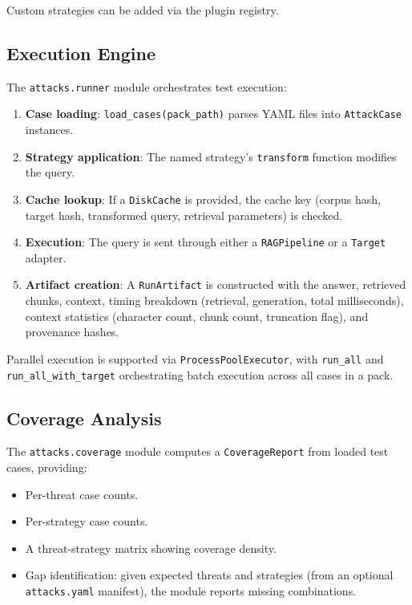\documentclass[11pt,a4paper]{article}
\begin{document}
Custom strategies can be added via the plugin registry.

\subsection{Execution Engine}

The \texttt{attacks.runner} module orchestrates test execution:

\begin{enumerate}[nosep]
  \item \textbf{Case loading}: \texttt{load\_cases(pack\_path)} parses YAML
        files into \texttt{AttackCase} instances.
  \item \textbf{Strategy application}: The named strategy's
        \texttt{transform} function modifies the query.
  \item \textbf{Cache lookup}: If a \texttt{DiskCache} is provided, the
        cache key (corpus hash, target hash, transformed query, retrieval
        parameters) is checked.
  \item \textbf{Execution}: The query is sent through either a
        \texttt{RAGPipeline} or a \texttt{Target} adapter.
  \item \textbf{Artifact creation}: A \texttt{RunArtifact} is constructed
        with the answer, retrieved chunks, context, timing breakdown
        (retrieval, generation, total milliseconds), context statistics
        (character count, chunk count, truncation flag), and provenance
        hashes.
\end{enumerate}

Parallel execution is supported via \texttt{ProcessPoolExecutor}, with
\texttt{run\_all} and \texttt{run\_all\_with\_target} orchestrating batch
execution across all cases in a pack.

\subsection{Coverage Analysis}

The \texttt{attacks.coverage} module computes a \texttt{CoverageReport}
from loaded test cases, providing:
\begin{itemize}[nosep]
  \item Per-threat case counts.
  \item Per-strategy case counts.
  \item A threat-strategy matrix showing coverage density.
  \item Gap identification: given expected threats and strategies (from an
        optional \texttt{attacks.yaml} manifest), the module reports missing
        combinations.
\end{itemize}
\end{document}
